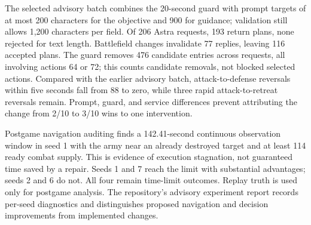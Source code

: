 \documentclass{article}
\begin{document}
The selected advisory batch combines the 20-second guard with prompt targets of at most 200 characters for the objective and 900 for guidance; validation still allows 1,200 characters per field. Of 206 Astra requests, 193 return plans, none rejected for text length. Battlefield changes invalidate 77 replies, leaving 116 accepted plans. The guard removes 476 candidate entries across requests, all involving actions 64 or 72; this counts candidate removals, not blocked selected actions. Compared with the earlier advisory batch, attack-to-defense reversals within five seconds fall from 88 to zero, while three rapid attack-to-retreat reversals remain. Prompt, guard, and service differences prevent attributing the change from 2/10 to 3/10 wins to one intervention.

Postgame navigation auditing finds a 142.41-second continuous observation window in seed 1 with the army near an already destroyed target and at least 114 ready combat supply. This is evidence of execution stagnation, not guaranteed time saved by a repair. Seeds 1 and 7 reach the limit with substantial advantages; seeds 2 and 6 do not. All four remain time-limit outcomes. Replay truth is used only for postgame analysis. The repository's advisory experiment report records per-seed diagnostics and distinguishes proposed navigation and decision improvements from implemented changes.
\end{document}

